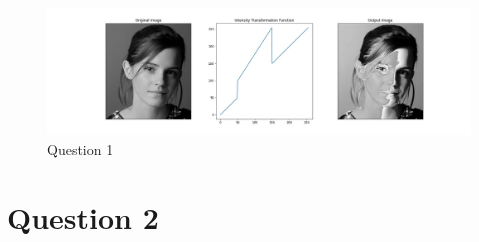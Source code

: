 \documentclass[11pt]{article}
\begin{document}
\begin{figure}[!h]
    \centering
    \includegraphics[width=\textwidth]{Images/1.jpg}
    \caption{Question 1}
    \label{Question 1}
\end{figure}

\section*{Question 2}
\end{document}
